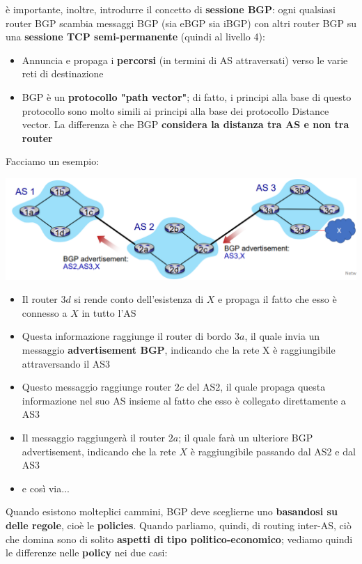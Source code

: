 \documentclass[12pt]{article}
\begin{document}
è importante, inoltre, introdurre il concetto di \textbf{sessione BGP}: ogni qualsiasi router BGP scambia messaggi BGP (sia eBGP sia iBGP) con altri router BGP 
su una \textbf{sessione TCP semi-permanente} (quindi al livello 4):
\begin{itemize}
    \item Annuncia e propaga i \textbf{percorsi} (in termini di AS attraversati) verso le varie reti di destinazione
    \item BGP è un \textbf{protocollo "path vector"}; di fatto, i principi alla base di questo protocollo sono molto simili ai principi alla base dei protocollo Distance vector. La differenza è che BGP \textbf{considera la distanza tra AS e non tra router}
\end{itemize}
Facciamo un esempio:
\begin{center}
    \includegraphics[width =0.80\linewidth]{Images/115.png}
\end{center}
\begin{itemize}
    \item Il router $3d$ si rende conto dell'esistenza di $X$ e propaga il fatto che esso è connesso a $X$ in tutto l'AS
    \item Questa informazione raggiunge il router di bordo $3a$, il quale invia un messaggio \textbf{advertisement BGP}, indicando che la rete X è raggiungibile attraversando il AS3
    \item Questo messaggio raggiunge router $2c$ del AS2, il quale propaga questa informazione nel suo AS insieme al fatto che esso è collegato direttamente a AS3
    \item Il messaggio raggiungerà il router $2a$; il quale farà un ulteriore BGP advertisement, indicando che la rete $X$ è raggiungibile passando dal AS2 e dal AS3 
    \item e così via...
\end{itemize}
Quando esistono molteplici cammini, BGP deve sceglierne uno \textbf{basandosi su delle regole}, cioè le \textbf{policies}.
Quando parliamo, quindi, di routing inter-AS, ciò che domina sono di solito \textbf{aspetti di tipo politico-economico}; vediamo quindi le differenze nelle \textbf{policy} nei due casi:
\end{document}
